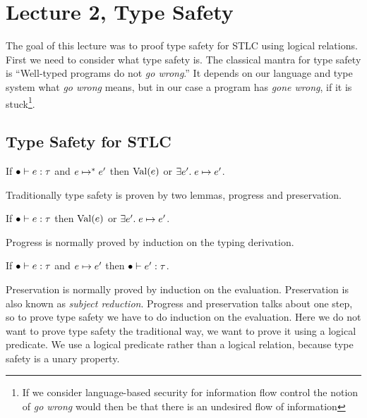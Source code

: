 \section*{Lecture 2, Type Safety}
The goal of this lecture was to proof type safety for STLC using logical relations. First we need to consider what type safety is. The classical mantra for type safety is ``Well-typed programs do not \emph{go wrong}.'' It depends on our language and type system what \emph{go wrong} means, but in our case a program has \emph{gone wrong}, if it is stuck\footnote{If we consider language-based security for information flow control the notion of \emph{go wrong} would then be that there is an undesired flow of information}. 

\subsection*{Type Safety for STLC}
\begin{stlctypesafety}
  If $\bullet \vdash e : \tau$ and $e \mapsto^{*} e'$ then $\operatorname{Val}(e)$ or $\exists e'. \; e \mapsto e'$.
\end{stlctypesafety}
Traditionally type safety is proven by two lemmas, progress and preservation.
\begin{progress}[Progress]
  If $\bullet \vdash e : \tau$ then $\operatorname{Val}(e)$ or $\exists e'. \; e \mapsto e'$.
\end{progress}
Progress is normally proved by induction on the typing derivation.
\begin{preservation}[Preservation]
  If $\bullet \vdash e : \tau$ and $e \mapsto e'$ then $\bullet \vdash e' : \tau$.
\end{preservation}
Preservation is normally proved by induction on the evaluation.
Preservation is also known as \emph{subject reduction}. Progress and preservation talks about one step, so to prove type safety we have to do induction on the evaluation. Here we do not want to prove type safety the traditional way, we want to prove it using a logical predicate. We use a logical predicate rather than a logical relation, because type safety is a unary property.

